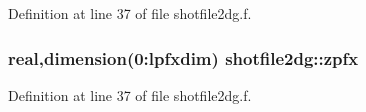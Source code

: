 Definition at line 37 of file shotfile2dg.f.\hypertarget{namespaceshotfile2dg_9768ea742d6b7efdfd6e610f1e6f8914}{
\subsubsection[zpfx]{\setlength{\rightskip}{0pt plus 5cm}real,dimension(0:{\bf lpfxdim}) {\bf shotfile2dg::zpfx}}}
\label{namespaceshotfile2dg_9768ea742d6b7efdfd6e610f1e6f8914}




Definition at line 37 of file shotfile2dg.f.